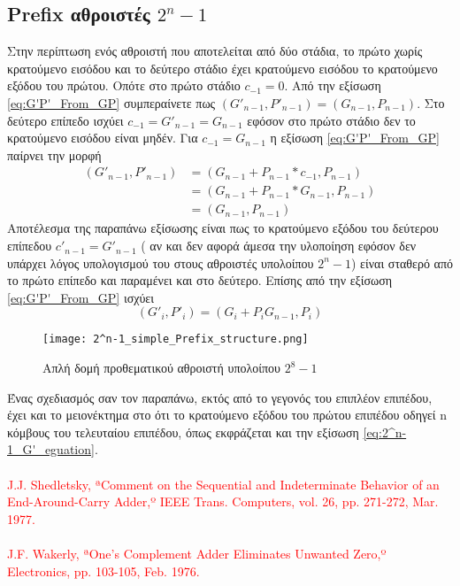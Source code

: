 \subsection{Prefix αθροιστές $2^n-1$ }
Στην περίπτωση ενός αθροιστή που αποτελείται από δύο στάδια, το πρώτο χωρίς κρατούμενο εισόδου
και το δεύτερο στάδιο έχει κρατούμενο εισόδου το κρατούμενο εξόδου του πρώτου. Οπότε στο
πρώτο στάδιο $c_{-1} = 0$. Από την εξίσωση \ref{eq:G'P'_From_GP} συμπεραίνετε πως 
$(G'_{n-1},P'_{n-1}) = (G_{n-1},P_{n-1})$. Στο δεύτερο επίπεδο ισχύει 
$c_{-1} = G'_{n-1} = G_{n-1} $ εφόσον στο πρώτο στάδιο δεν το κρατούμενο εισόδου είναι μηδέν.
Για $c_{-1} = G_{n-1}$ η εξίσωση \ref{eq:G'P'_From_GP} παίρνει την μορφή 
\begin{equation*}
\begin{split}
    (G'_{n-1},P'_{n-1}) &= ( G_{n-1} + P_{n-1}*c_{-1} ,  P_{n-1} )\\
    &=( G_{n-1} + P_{n-1}*G_{n-1} ,  P_{n-1} )\\
    &=(G_{n-1},P_{n-1})
\end{split}    
\end{equation*}
Αποτέλεσμα της παραπάνω εξίσωσης είναι πως το κρατούμενο εξόδου του δεύτερου επίπεδου 
$c'_{n-1} = G'_{n-1}$
( αν και δεν αφορά άμεσα την υλοποίηση εφόσον δεν υπάρχει λόγος υπολογισμού του 
στους αθροιστές υπολοίπου $2^n-1$) είναι σταθερό από το πρώτο επίπεδο και παραμένει και στο 
δεύτερο. Επίσης από την εξίσωση \ref{eq:G'P'_From_GP} ισχύει 
\begin{equation}
\label{eq:2^n-1_G'_eguation}
    (G'_i,P'_i) = (G_i + P_iG_{n-1} , P_{i})
\end{equation}

\begin{figure}[H]
\centering
\texttt{[image: 2^n-1\_simple\_Prefix\_structure.png]}
\caption{Απλή δομή προθεματικού αθροιστή υπολοίπου $2^8-1$}
\label{fig:2^n-1_simple_Prefix_structure}
\end{figure}
Ένας σχεδιασμός σαν τον παραπάνω, εκτός από το γεγονός του επιπλέον επιπέδου,
έχει και το μειονέκτημα στο ότι το κρατούμενο εξόδου του πρώτου επιπέδου οδηγεί 
n κόμβους του τελευταίου επιπέδου, όπως εκφράζεται και την εξίσωση \ref{eq:2^n-1_G'_eguation}.
\\\\
\textcolor{red}{
J.J. Shedletsky, ªComment on the Sequential and Indeterminate
Behavior of an End-Around-Carry Adder,º IEEE Trans. Computers,
vol. 26, pp. 271-272, Mar. 1977.
\\\\
J.F. Wakerly, ªOne's Complement Adder Eliminates Unwanted
Zero,º Electronics, pp. 103-105, Feb. 1976.
}
















